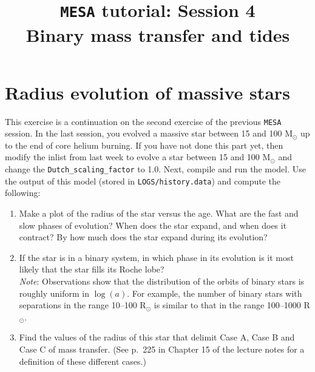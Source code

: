 \documentclass[11pt,a4paper]{article}
\begin{document}
\title{
    \textbf{\texttt{MESA} tutorial: Session 4} \\
    \textbf{\Large Binary mass transfer and tides}
}
\date{}
\maketitle
\vspace{-1cm}

\noindent


\section{Radius evolution of massive stars}

This exercise is a continuation on the second exercise of the previous \texttt{MESA} session. In the last session, you evolved a massive star between 15 and 100 M$_\odot$ up to the end of core helium burning. If you have not done this part yet, then modify the inlist from last week to evolve a star between 15 and 100 M$_\odot$ and change the \verb|Dutch_scaling_factor| to 1.0. Next, compile and run the model. Use the output of this model (stored in \verb|LOGS/history.data|) and compute the following:

\begin{enumerate}
\item Make a plot of the radius of the star versus the age. What are the fast and slow phases of evolution? When does the star expand, and when does it contract? By how much does the star expand during its evolution?
\item If the star is in a binary system, in which phase in its evolution is it most likely that the star fills its Roche lobe?\\
\textit{Note}: Observations show that the distribution of the orbits of binary stars is roughly uniform in $\log(a)$. For example, the number of binary stars with separations in the range 10--100 R$_\odot$ is similar to that in the range 100--1000 R$_\odot$.
\item Find the values of the radius of this star that delimit Case A, Case B and Case C of mass transfer. (See p.\ 225 in Chapter 15 of the lecture notes for a definition of these different cases.)
\end{enumerate}
\end{document}

